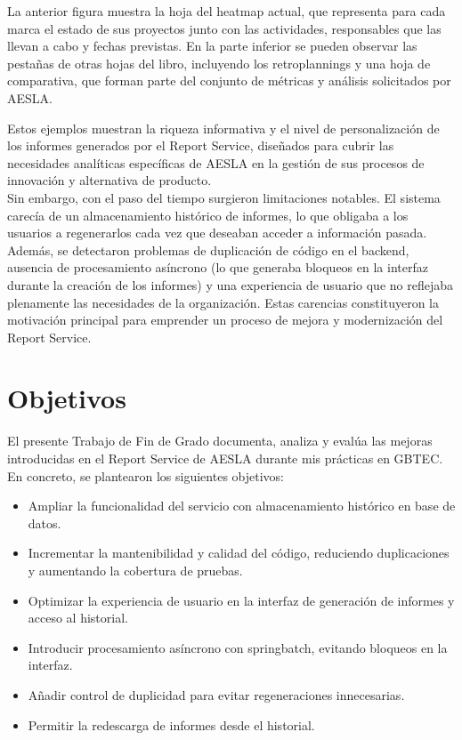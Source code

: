 \documentclass[11pt,a4paper,titlepage,oneside]{report}
\begin{document}
La anterior figura muestra la hoja del heatmap actual, que representa para cada marca el estado de sus proyectos junto con las actividades, responsables que las llevan a cabo y fechas previstas. En la parte inferior se pueden observar las pestañas de otras hojas del libro, incluyendo los retroplannings y una hoja de comparativa, que forman parte del conjunto de métricas y análisis solicitados por AESLA.

Estos ejemplos muestran la riqueza informativa y el nivel de personalización de los informes generados por el Report Service, diseñados para cubrir las necesidades analíticas específicas de AESLA en la gestión de sus procesos de innovación y alternativa de producto.\\

Sin embargo, con el paso del tiempo surgieron limitaciones notables. El sistema carecía de un almacenamiento histórico de informes, lo que obligaba a los usuarios a regenerarlos cada vez que deseaban acceder a información pasada. Además, se detectaron problemas de duplicación de código en el backend, ausencia de procesamiento asíncrono (lo que generaba bloqueos en la interfaz durante la creación de los informes) y una experiencia de usuario que no reflejaba plenamente las necesidades de la organización. Estas carencias constituyeron la motivación principal para emprender un proceso de mejora y modernización del Report Service.

\section{Objetivos}

El presente Trabajo de Fin de Grado documenta, analiza y evalúa las mejoras introducidas en el Report Service de AESLA durante mis prácticas en GBTEC. En concreto, se plantearon los siguientes objetivos:

\begin{itemize}
    \item Ampliar la funcionalidad del servicio con almacenamiento histórico en base de datos.
    \item Incrementar la mantenibilidad y calidad del código, reduciendo duplicaciones y aumentando la cobertura de pruebas.
    \item Optimizar la experiencia de usuario en la interfaz de generación de informes y acceso al historial.
    \item Introducir procesamiento asíncrono con \gls{springbatch}, evitando bloqueos en la interfaz.
    \item Añadir control de duplicidad para evitar regeneraciones innecesarias.
    \item Permitir la redescarga de informes desde el historial.
\end{itemize}
\end{document}
